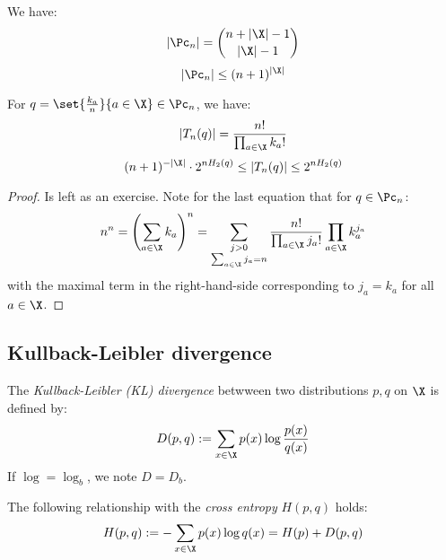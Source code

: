 \documentclass[toc]{../cs-classes/cs-classes}
\begin{document}
\begin{lemma}
    We have:
    \begin{equation}
        |\Pc_n|=\binom{n+|\X|-1}{|\X|-1}
    \end{equation}
    \begin{equation}
        |\Pc_n|\leq(n+1)^{|\X|}
    \end{equation}

    For $q=\set{\frac{k_a}{n}}{a\in\X}\in\Pc_n$, we have:
    \begin{equation}
        |T_n(q)|=\frac{n!}{\prod_{a\in\X}k_a!}
    \end{equation}
    \begin{equation}
        (n+1)^{-|\X|} \cdot 2^{nH_2(q)} \leq |T_n(q)| \leq 2^{nH_2(q)}
    \end{equation}
\end{lemma}
\begin{proof}
    Is left as an exercise. Note for the last equation that for $q\in\Pc_n$:
    \begin{equation*}
        n^n = \left(\sum_{a\in\X}k_a\right)^n = \sum_{\substack{j>0\\\sum_{a\in\X}j_a=n}} \frac{n!}{\prod_{a\in\X}j_a!} \prod_{a\in\X}k_a^{j_a}
    \end{equation*}
    with the maximal term in the right-hand-side corresponding to $j_a=k_a$ for all $a\in\X$.
\end{proof}

\subsection{Kullback-Leibler divergence}
\begin{definition}
    The \emph{Kullback-Leibler (KL) divergence} betwween two distributions $p, q$ on $\X$ is defined by:
    \begin{equation*}
        D(p, q) := \sum_{x\in\X}p(x)\log\frac{p(x)}{q(x)}
    \end{equation*}
    If $\log=\log_b$, we note $D=D_b$.
\end{definition}

\begin{property}
    The following relationship with the \emph{cross entropy} $H(p, q)$ holds:
    \begin{equation}
        \label{eq:relationship-cross-entropy}
        H(p, q) := - \sum_{x\in\X}p(x)\log q(x) = H(p) + D(p, q)
    \end{equation}
\end{property}
\end{document}
